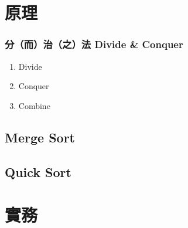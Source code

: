 \documentclass{beamer}
\begin{document}
\section{原理}

\frame
{
	\frametitle{分（而）治（之）法 Divide \& Conquer}
	
	\begin{enumerate}
		\item Divide
		\item Conquer
		\item Combine
	\end{enumerate}

}

\subsection{Merge Sort}

\subsection{Quick Sort}

\section{實務}
\end{document}
